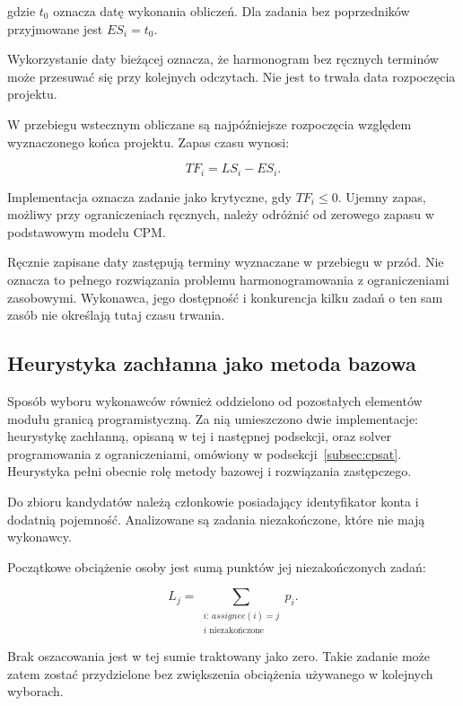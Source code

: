 gdzie \(t_0\) oznacza datę wykonania obliczeń. Dla zadania bez poprzedników przyjmowane jest \(ES_i=t_0\).

Wykorzystanie daty bieżącej oznacza, że harmonogram bez ręcznych terminów może przesuwać się przy kolejnych odczytach. Nie jest to trwała data rozpoczęcia projektu.

W przebiegu wstecznym obliczane są najpóźniejsze rozpoczęcia względem wyznaczonego końca projektu. Zapas czasu wynosi:

\begin{equation}
    TF_i=LS_i-ES_i.
    \label{eq:harmonogram-zapas}
\end{equation}

Implementacja oznacza zadanie jako krytyczne, gdy \(TF_i\leq 0\). Ujemny zapas, możliwy przy ograniczeniach ręcznych, należy odróżnić od zerowego zapasu w podstawowym modelu CPM.

Ręcznie zapisane daty zastępują terminy wyznaczane w przebiegu w przód. Nie oznacza to pełnego rozwiązania problemu harmonogramowania z ograniczeniami zasobowymi. Wykonawca, jego dostępność i konkurencja kilku zadań o ten sam zasób nie określają tutaj czasu trwania.

\subsection{Heurystyka zachłanna jako metoda bazowa}

Sposób wyboru wykonawców również oddzielono od pozostałych elementów modułu granicą programistyczną. Za nią umieszczono dwie implementacje: heurystykę zachłanną, opisaną w tej i następnej podsekcji, oraz solver programowania z ograniczeniami, omówiony w podsekcji~\ref{subsec:cpsat}. Heurystyka pełni obecnie rolę metody bazowej i rozwiązania zastępczego.

Do zbioru kandydatów należą członkowie posiadający identyfikator konta i dodatnią pojemność. Analizowane są zadania niezakończone, które nie mają wykonawcy.

Początkowe obciążenie osoby jest sumą punktów jej niezakończonych zadań:

\begin{equation}
    L_j =
    \sum_{\substack{i:\,assignee(i)=j\\i\text{ niezakończone}}}p_i.
    \label{eq:przydzial-obciazenie}
\end{equation}

Brak oszacowania jest w tej sumie traktowany jako zero. Takie zadanie może zatem zostać przydzielone bez zwiększenia obciążenia używanego w kolejnych wyborach.

